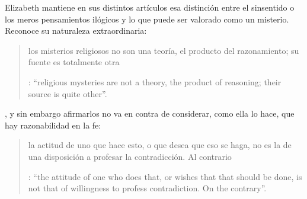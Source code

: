 Elizabeth mantiene en sus distintos artículos esa distinción entre el sinsentido o los meros pensamientos ilógicos y lo que puede ser valorado como un misterio. Reconoce su naturaleza extraordinaria: \blockquote[{\Cite[122-123]{anscombe1981parmenides:qli}}: \enquote{religious mysteries are not a theory, the product of reasoning; their source is quite other}.]{los misterios religiosos no son una teoría, el producto del razonamiento; su fuente es totalmente otra}, y sin embargo afirmarlos no va en contra de considerar, como ella lo hace, que hay razonabilidad en la fe: \blockquote[{\Cite[122]{anscombe1981parmenides:qli}}: \enquote{the attitude of one who does that, or wishes that that should be done, is not that of willingness to profess contradiction. On the contrary}.]{la actitud de uno que hace esto, o que desea que eso se haga, no es la de una disposición a profesar la contradicción. Al contrario}.

